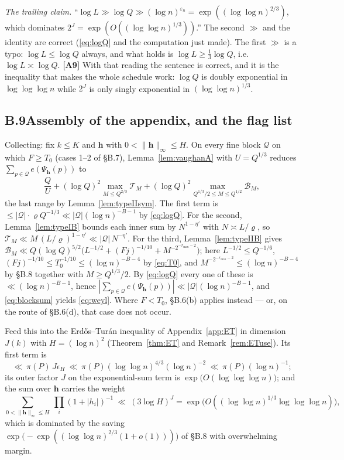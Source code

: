 \documentclass[11pt]{article}
\theoremstyle{definition}
\theoremstyle{plain}
\begin{document}
\emph{The trailing claim.}  ``$\log L\gg\log Q\gg(\log
n)^{\varepsilon_{n}}=\exp((\log\log n)^{2/3})$, which dominates
$2^{J}=\exp(O((\log\log n)^{1/3}))$.''  The second $\gg$ and the identity
are correct (\eqref{eq:logQ} and the computation just made).  The first
$\gg$ is a typo: $\log L\le\log Q$ always, and what holds is
$\log L\ge\tfrac13\log Q$, i.e.\ $\log L\asymp\log Q$.  \textbf{[A9]}
With that reading the sentence is correct, and it is the inequality that
makes the whole schedule work: $\log Q$ is doubly exponential in
$\log\log\log n$ while $2^{J}$ is only singly exponential in
$(\log\log n)^{1/3}$.

\subsection*{B.9\quad Assembly of the appendix, and the flag list}

Collecting: fix $k\le K$ and $\mathbf h$ with
$0<\|\mathbf h\|_{\infty}\le H$.  On every fine block $\mathcal Q$ on
which $F\ge T_{0}$ (cases 1--2 of \S B.7),
Lemma~\ref{lem:vaughanA} with $U=Q^{1/3}$ reduces
$\sum_{p\in\mathcal Q}e(\Psi_{\mathbf h}(p))$ to
\[
\frac{Q}{U}+(\log Q)^{2}\max_{M\le Q^{2/3}}\mathcal T_{M}
+(\log Q)^{2}\max_{Q^{1/3}/2\le M\le Q^{1/2}}\mathcal B_{M},
\]
the last range by Lemma~\ref{lem:typeIIsym}.  The first term is
$\le|\mathcal Q|\cdot\varrho Q^{-1/3}\ll|\mathcal Q|(\log n)^{-B-1}$ by
\eqref{eq:logQ}.  For the second, Lemma~\ref{lem:typeIB} bounds each
inner sum by $N^{1-\eta'}$ with $N\asymp L/\varrho$, so
$\mathcal T_{M}\ll M\,(L/\varrho)^{1-\eta'}
\ll|\mathcal Q|\,N^{-\eta'}$.  For the third,
Lemma~\ref{lem:typeIIB} gives
$\mathcal B_{M}\ll Q(\log Q)^{5/2}\bigl(L^{-1/2}+(Fj)^{-1/10}
+M^{-2^{-r_{\max}-2}}\bigr)$; here $L^{-1/2}\le Q^{-1/6}$,
$(Fj)^{-1/10}\le T_{0}^{-1/10}\le(\log n)^{-B-4}$ by \eqref{eq:T0}, and
$M^{-2^{-r_{\max}-2}}\le(\log n)^{-B-4}$ by \S B.8 together with
$M\ge Q^{1/3}/2$.  By \eqref{eq:logQ} every one of these is
$\ll(\log n)^{-B-1}$, hence
$|\sum_{p\in\mathcal Q}e(\Psi_{\mathbf h}(p))|\ll|\mathcal Q|
(\log n)^{-B-1}$, and \eqref{eq:blocksum} yields \eqref{eq:weyl}.  Where
$F<T_{0}$, \S B.6(b) applies instead --- or, on the route of \S B.6(d),
that case does not occur.

Feed this into the Erd\H{o}s--Tur\'an inequality of
Appendix~\ref{app:ET} in dimension $J(k)$ with $H=(\log n)^{2}$
(Theorem~\ref{thm:ET} and Remark~\ref{rem:ETuse}).  Its first term is
\[
\ll\ \pi(P)\,J\epsilon_{H}
\ \ll\ \pi(P)(\log\log n)^{4/3}(\log n)^{-2}
\ \ll\ \pi(P)(\log n)^{-1};
\]
its outer factor $J$ on the exponential-sum term is
$\exp\bigl(O(\log\log\log n)\bigr)$; and the sum
over $\mathbf h$ carries the weight
\[
\sum_{0<\|\mathbf h\|_{\infty}\le H}\ \prod_{i}(1+|h_{i}|)^{-1}
\ \ll\ (3\log H)^{J}
=\exp\bigl(O((\log\log n)^{1/3}\log\log\log n)\bigr),
\]
which is dominated by the saving
$\exp\bigl(-\exp((\log\log n)^{2/3}(1+o(1)))\bigr)$ of \S B.8 with
overwhelming margin.
\end{document}
